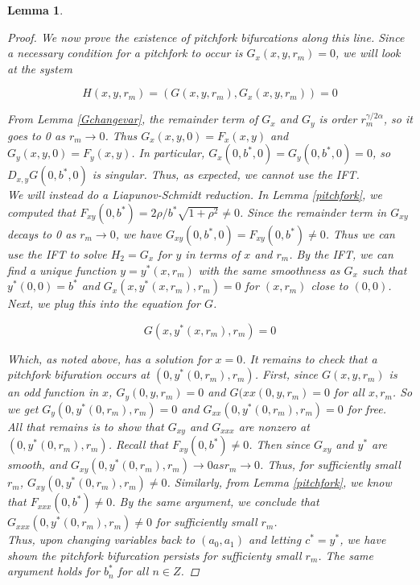 \documentclass[12pt]{article}
\newtheorem{lemma}{Lemma}
\begin{document}
\begin{lemma}
\begin{proof}
We now prove the existence of pitchfork bifurcations along this line. Since a necessary condition for a pitchfork to occur is $G_x(x, y, r_m) = 0$, we will look at the system

\begin{equation}
H(x,y,r_m) = (G(x,y,r_m), G_x(x,y,r_m)) = 0
\end{equation}

From Lemma \ref{Gchangevar}, the remainder term of $G_x$ and $G_y$ is order $r_m^{\gamma/2 \alpha}$, so it goes to 0 as $r_m \rightarrow 0$. Thus $G_x(x,y,0) = F_x(x,y)$ and $G_y(x,y,0) = F_y(x,y)$. In particular, $G_x(0,b^*,0) = G_y(0, b^*, 0) = 0$, so $D_{x,y}G(0,b^*,0)$ is singular. Thus, as expected, we cannot use the IFT.\\

We will instead do a Liapunov-Schmidt reduction. In Lemma \ref{pitchfork}, we computed that $F_{xy}(0, b^*) = 2 \rho/b^* \sqrt{1+ \rho^2} \neq 0$. Since the remainder term in $G_{xy}$ decays to 0 as $r_m \rightarrow 0$, we have $G_{xy}(0, b^*, 0) = F_{xy}(0, b^*) \neq 0$. Thus we can use the IFT to solve $H_2 = G_x$ for $y$ in terms of $x$ and $r_m$. By the IFT, we can find a unique function $y = y^*(x, r_m)$ with the same smoothness as $G_x$ such that $y^*(0, 0) = b^*$ and $G_x(x, y^*(x, r_m), r_m) = 0$ for $(x, r_m)$ close to $(0, 0)$.\\

Next, we plug this into the equation for $G$.

\begin{equation}
G(x, y^*(x, r_m), r_m) = 0
\end{equation}

Which, as noted above, has a solution for $x = 0$. It remains to check that a pitchfork bifuration occurs at $(0, y^*(0, r_m), r_m)$. First, since $G(x, y, r_m)$ is an odd function in $x$, $G_y(0, y, r_m) = 0$ and $G({xx}(0, y, r_m) = 0$ for all $x, r_m$. So we get $G_y(0, y^*(0, r_m), r_m) = 0$ and $G_{xx}(0, y^*(0, r_m), r_m) = 0$ for free.\\

All that remains is to show that $G_{xy}$ and $G_{xxx}$ are nonzero at $(0, y^*(0, r_m), r_m)$. Recall that $F_{xy}(0, b^*) \neq 0$. Then since $G_{xy}$ and $y^*$ are smooth, and $G_{xy}(0, y^*(0, r_m), r_m) \rightarrow 0 as r_m \rightarrow 0$. Thus, for sufficiently small $r_m$, $G_{xy}(0, y^*(0, r_m), r_m) \neq 0$. Similarly, from Lemma \ref{pitchfork}, we know that $F_{xxx}(0, b^*) \neq 0$. By the same argument, we conclude that $G_{xxx}(0, y^*(0, r_m), r_m) \neq 0$ for sufficiently small $r_m$.\\

Thus, upon changing variables back to $(a_0, a_1)$ and letting $c^* = y^*$, we have shown the pitchfork bifurcation persists for sufficienty small $r_m$. The same argument holds for $b^*_n$ for all $n \in Z$. 

\end{proof}
\end{lemma}
\end{document}
